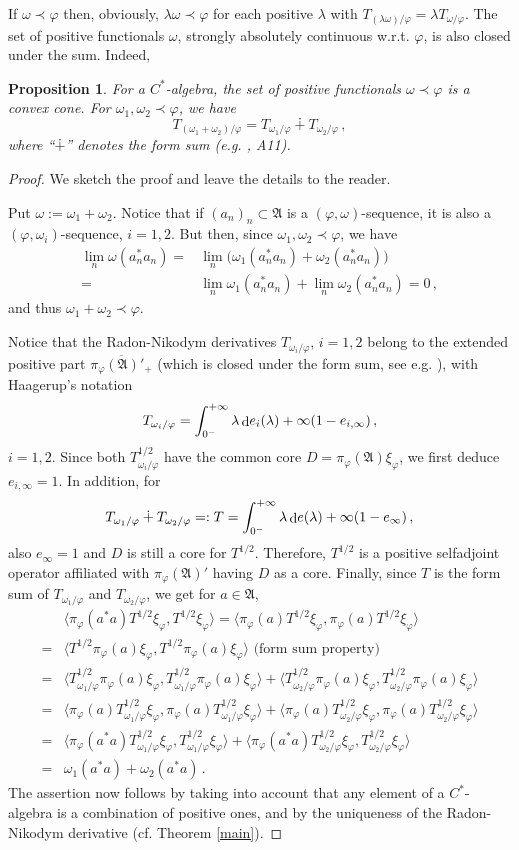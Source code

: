 \documentclass[12pt]{amsart}
\numberwithin{equation}{section}
\def\ga{{\mathfrak A}} \def\gpa{{\mathfrak a}}
\def\l{\lambda} \def\L{\Lambda}
\def\f{\varphi}\def\ff{\phi} \def\F{\Phi}
\def\om{\omega} \def\Om{\Omega}
\newtheorem{prop}[thm]{Proposition}
\def\di{\mathop{\rm d}\!}
\begin{document}
If $\om\prec\f$ then, obviously, $\l\om\prec\f$ for each positive $\l$ with $T_{(\l\om)/\f}=\l T_{\om/\f}$. The set of positive functionals 
$\om$, strongly absolutely continuous w.r.t. $\f$, is also closed under the sum. Indeed,
\begin{prop}
\label{concon}
For a $C^*$-algebra, the set of positive functionals 
$\om\prec\f$ is a convex cone. For $\om_1,\om_2\prec\f$, we have
$$
T_{(\om_1+\om_2)/\f}=T_{\om_1/\f}\dotplus T_{\om_2/\f}\,,
$$
where ``$\dotplus$'' denotes the form sum (e.g. \cite{S}, A11).
\end{prop}
\begin{proof}
We sketch the proof and leave the details to the reader.

Put $\om:=\om_1+\om_2$. Notice that if $(a_n)_n\subset\ga$ is a $(\f,\om)$-sequence, it is also a $(\f,\om_i)$-sequence, $i=1,2$.
But then, since $\om_1,\om_2\prec\f$, we have
\begin{align*}
\lim_n\om(a_n^*a_n)=&\lim_n\big(\om_1(a_n^*a_n)+\om_2(a_n^*a_n)\big)\\
=&\lim_n\om_1(a_n^*a_n)+\lim_n\om_2(a_n^*a_n)=0\,,
\end{align*}
and thus $\om_1+\om_2\prec\f$.

Notice that the Radon-Nikodym derivatives $T_{\om_i/\f}$, $i=1,2$ belong to the extended positive part $\overline{\pi_\f(\ga)'_+}$ (which is closed under the form sum, see e.g. \cite{S}), with Haagerup's notation
$$
T_{\om_i/\f}=\int_{0^-}^{+\infty}\l\di e_i(\l)+\infty(1-e_{i,\infty})\,,
$$ 
$i=1,2$.  Since both $T_{\om_i/\f}^{1/2}$ have the common core $D=\pi_\f(\ga)\xi_\f$, we first deduce $e_{i,\infty}=1$. In addition,
for 
$$
T_{\om_1/\f}\dotplus T_{\om_2/\f}=:T=\int_{0^-}^{+\infty}\l\di e(\l)+\infty(1-e_{\infty})\,,
$$
also $e_{\infty}=1$ and $D$ is still a core for $T^{1/2}$. Therefore, $T^{1/2}$ is a positive selfadjoint operator affiliated with $\pi_\f(\ga)'$ having
$D$ as a core. Finally, since $T$ is the form sum of $T_{\om_1/\f}$ and $T_{\om_2/\f}$, we get for $a\in\ga$,
\begin{align*}
&\langle\pi_\f(a^*a)T^{1/2}\xi_\f,T^{1/2}\xi_\f\rangle=\langle\pi_\f(a)T^{1/2}\xi_\f,\pi_\f(a)T^{1/2}\xi_\f\rangle\\
=&\langle T^{1/2}\pi_\f(a)\xi_\f,T^{1/2}\pi_\f(a)\xi_\f\rangle\,\,\text{(form sum property)}\\
=&\langle T_{\om_1/\f}^{1/2}\pi_\f(a)\xi_\f,T_{\om_1/\f}^{1/2}\pi_\f(a)\xi_\f\rangle
+\langle T_{\om_2/\f}^{1/2}\pi_\f(a)\xi_\f,T_{\om_2/\f}^{1/2}\pi_\f(a)\xi_\f\rangle\\
=&\langle \pi_\f(a)T_{\om_1/\f}^{1/2}\xi_\f,\pi_\f(a)T_{\om_1/\f}^{1/2}\xi_\f\rangle
+\langle \pi_\f(a)T_{\om_2/\f}^{1/2}\xi_\f,\pi_\f(a)T_{\om_2/\f}^{1/2}\xi_\f\rangle\\
=&\langle \pi_\f(a^*a)T_{\om_1/\f}^{1/2}\xi_\f,T_{\om_1/\f}^{1/2}\xi_\f\rangle
+\langle \pi_\f(a^*a)T_{\om_2/\f}^{1/2}\xi_\f,T_{\om_2/\f}^{1/2}\xi_\f\rangle\\
=&\om_1(a^*a)+\om_2(a^*a)\,.
\end{align*}
The assertion now follows by taking into account that any element of a $C^*$-algebra is a combination of positive ones, and by the uniqueness of the Radon-Nikodym derivative (cf. Theorem \ref{main}).
\end{proof}
\end{document}
